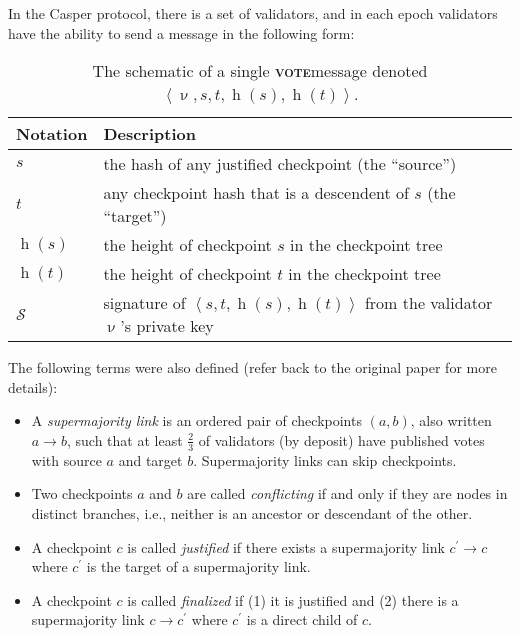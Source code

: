 \documentclass[12pt, final]{article}
\newcommand{\h}{\operatorname{h}\xspace}
\newcommand{\signature}{\ensuremath{\mathcal{S}}\space}
\newcommand{\msgVOTE}{\textbf{\textsc{vote}}\space}
\begin{document}
In the Casper protocol, there is a set of validators, and in each epoch validators have the ability to send a message in the following form:

\begin{table}[bth]
\centering

   \begin{tabular}{l l}
	\toprule
	\textbf{Notation} & \textbf{Description} \\
	\midrule
	$s$ & the hash of any justified checkpoint (the ``source'') \\
	$t$ & any checkpoint hash that is a descendent of  $s$ (the ``target'') \\
	$\h(s)$ & the height of checkpoint $s$ in the checkpoint tree \\
	$\h(t)$ & the height of checkpoint $t$ in the checkpoint tree \\
	\signature & signature of $\left\langle s, t, \h(s), \h(t) \right\rangle$ from the validator $\upnu$'s private key \\
	\bottomrule
	\end{tabular}


\vspace{0.15in}
\caption{The schematic of a single \msgVOTE message denoted $\left\langle \upnu, s, t, \h(s), \h(t) \right\rangle$.}
\label{tbl:messages}
\end{table}

The following terms were also defined (refer back to the original paper for more details):
\begin{itemize}
\item A \emph{supermajority link} is an ordered pair of checkpoints $(a, b)$, also written $a \rightarrow b$, such that at least $\frac{2}{3}$ of validators (by deposit) have published votes with source $a$ and target $b$.  Supermajority links can skip checkpoints.

\item Two checkpoints $a$ and $b$ are called \emph{conflicting} if and only if they are nodes in distinct branches, i.e., neither is an ancestor or descendant of the other.

\item A checkpoint $c$ is called \emph{justified} if there exists a supermajority link $c^\prime \to c$ where $c^\prime$ is the target of a supermajority link. 

\item A checkpoint $c$ is called \emph{finalized} if (1) it is justified and (2) there is a supermajority link $c \to c^\prime$ where $c^\prime$ is a direct child of $c$.
\end{itemize}
\end{document}
